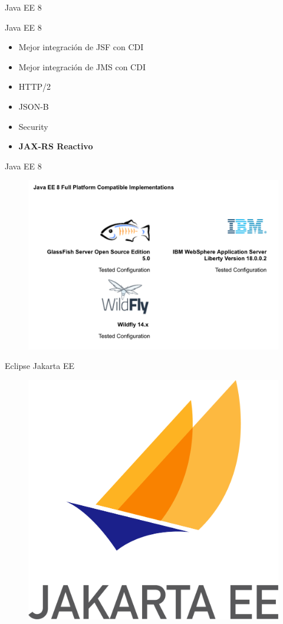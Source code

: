 \documentclass{beamer}
\begin{document}
\begin{frame}{Java EE 8}
\begin{alertblock}{Java EE 8}
\begin{itemize}
	\item Mejor integración de JSF con CDI
	\item Mejor integración de JMS con CDI
	\item HTTP/2
	\item JSON-B
	\item Security
	\item \textbf{JAX-RS Reactivo}
\end{itemize}
\end{alertblock}
\end{frame}

\begin{frame}{Java EE 8}
\begin{figure}
	\centering
	\includegraphics[width=0.7\linewidth]{Images/ee8}
\end{figure}
\end{frame}


\begin{frame}{Eclipse Jakarta EE}
\begin{figure}
	\centering
	\includegraphics[width=0.7\linewidth]{Images/jakartaee}
\end{figure}
\end{frame}
\end{document}
